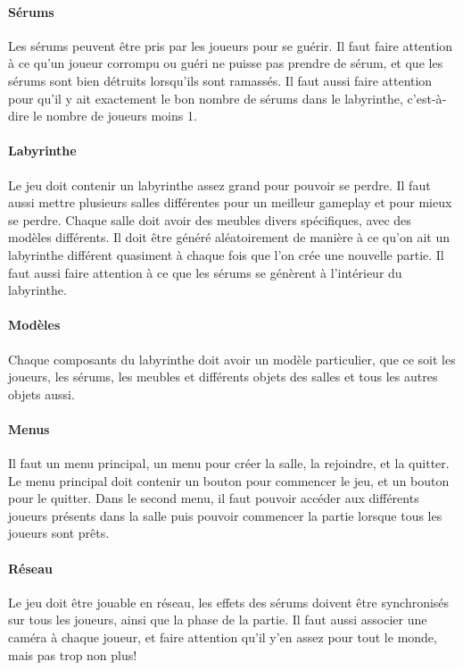 \documentclass{article}
\begin{document}
\paragraph{Sérums}
Les sérums peuvent être pris par les joueurs pour se guérir. Il faut faire attention à ce qu'un joueur corrompu ou guéri ne puisse pas prendre de sérum, et que les sérums sont bien détruits lorsqu'ils sont ramassés. Il faut aussi faire attention pour qu'il y ait exactement le bon nombre de sérums dans le labyrinthe, c'est-à-dire le nombre de joueurs moins 1.

\paragraph{Labyrinthe}
Le jeu doit contenir un labyrinthe assez grand pour pouvoir se perdre. Il faut aussi mettre plusieurs salles différentes pour un meilleur gameplay et pour mieux se perdre. Chaque salle doit avoir des meubles divers spécifiques, avec des modèles différents. Il doit être généré aléatoirement de manière à ce qu'on ait un labyrinthe différent quasiment à chaque fois que l'on crée une nouvelle partie. Il faut aussi faire attention à ce que les sérums se génèrent à l'intérieur du labyrinthe.

\paragraph{Modèles}
Chaque composants du labyrinthe doit avoir un modèle particulier, que ce soit les joueurs, les sérums, les meubles et différents objets des salles et tous les autres objets aussi.

\paragraph{Menus}
Il faut un menu principal, un menu pour créer la salle, la rejoindre, et la quitter. Le menu principal doit contenir un bouton pour commencer le jeu, et un bouton pour le quitter. Dans le second menu, il faut pouvoir accéder aux différents joueurs présents dans la salle puis pouvoir commencer la partie lorsque tous les joueurs sont prêts.

\paragraph{Réseau}
Le jeu doit être jouable en réseau, les effets des sérums doivent être synchronisés sur tous les joueurs, ainsi que la phase de la partie. Il faut aussi associer une caméra à chaque joueur, et faire attention qu'il y'en assez pour tout le monde, mais pas trop non plus! 
\end{document}
